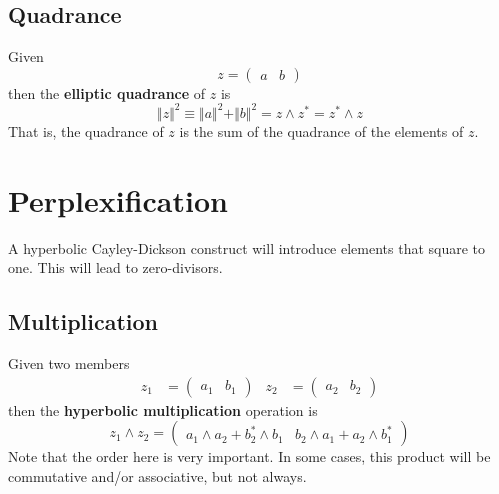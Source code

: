 \subsection{Quadrance}
Given
\begin{equation}
    z = \begin{pmatrix}
        a & b
    \end{pmatrix}
\end{equation}
then the \textbf{elliptic quadrance} of $z$ is
\begin{equation}
    \Vert z \Vert^{2} \equiv \Vert a \Vert^{2} + \Vert b \Vert^{2} = z \wedge z^{\ast} = z^{\ast} \wedge z
\end{equation}
That is, the quadrance of $z$ is the sum of the quadrance of the elements of $z$.
\section{Perplexification}
A hyperbolic Cayley-Dickson construct will introduce elements that square to one. This will lead to zero-divisors.
\subsection{Multiplication}
Given two members
\begin{align*}
    z_{1} &= \begin{pmatrix}
        a_{1} & b_{1}
    \end{pmatrix} &
    z_{2} &= \begin{pmatrix}
        a_{2} & b_{2}
    \end{pmatrix}
\end{align*}
then the \textbf{hyperbolic multiplication} operation is
\begin{equation}
    z_{1} \wedge z_{2} = \begin{pmatrix}
        a_{1} \wedge a_{2} + b_{2}^{\ast} \wedge b_{1} & b_{2} \wedge a_{1} + a_{2} \wedge b_{1}^{\ast}
    \end{pmatrix}
\end{equation}
Note that the order here is very important. In some cases, this product will be commutative and/or associative, but not always.
